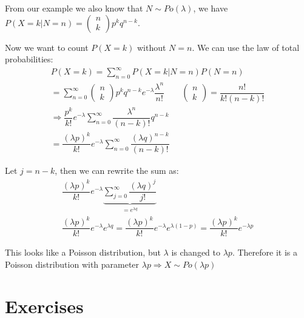 \par\bigskip
\noindent From our example we also know that $N\sim Po(\lambda)$, we have $P(X=k|N=n) = \begin{pmatrix}n\\k\end{pmatrix}p^kq^{n-k}$.\par
\noindent Now we want to count $P(X=k)$ without $N=n$. We can use the law of total probabilities: 
\begin{equation*}
  \begin{gathered}
    P(X=k) =\sum_{n=0}^{\infty}P(X=k|N=n)P(N=n)\\
    = \sum_{n=0}^{\infty}\begin{pmatrix}n\\k\end{pmatrix}p^kq^{n-k}e^{-\lambda}\dfrac{\lambda^n}{n!}\qquad \begin{pmatrix}n\\k\end{pmatrix} = \dfrac{n!}{k!(n-k)!}\\
    \Rightarrow \dfrac{p^k}{k!}e^{-\lambda}\sum_{n=0}^{\infty}\dfrac{\lambda^n}{(n-k)!}q^{n-k}\\
    = \dfrac{(\lambda p)^k}{k!}e^{-\lambda}\sum_{n=0}^{\infty}\dfrac{(\lambda q)^{n-k}}{(n-k)!}
  \end{gathered}
\end{equation*}\par
\noindent Let $j = n-k$, then we can rewrite the sum as:
\begin{equation*}
  \begin{gathered}
    \dfrac{(\lambda p)^k}{k!}e^{-\lambda}\underbrace{\sum_{j=0}^{\infty}\dfrac{(\lambda q)^j}{j!}}_{\text{$=e^{\lambda q}$}}\\
    \dfrac{(\lambda p)^k}{k!}e^{-\lambda}e^{\lambda q} = \dfrac{(\lambda p)^k}{k!}e^{-\lambda}e^{\lambda (1-p)} = \dfrac{(\lambda p)^k}{k!}e^{-\lambda p}
  \end{gathered}
\end{equation*}\par
\noindent This looks like a Poisson distribution, but $\lambda$ is changed to $\lambda p$. Therefore it is a Poisson distribution with parameter $\lambda p\Rightarrow X\sim Po(\lambda p)$
\par\bigskip
\section{Exercises}\par
